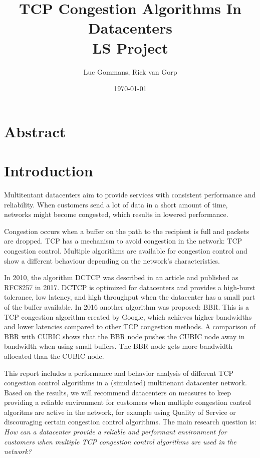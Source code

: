 \documentclass{article}
\title{TCP Congestion Algorithms In Datacenters \\
	\vspace{0.3cm}
	{\large LS Project}
}
\date{\today{}}
\author{Luc Gommans, Rick van Gorp}
\begin{document}
\maketitle

\section{Abstract}


\section{Introduction}


Multitentant datacenters aim to provide services with consistent performance
and reliability. When customers send a lot of data in a short amount of time,
networks might become congested, which results in lowered performance.

Congestion occurs when a buffer on the path to the recipient is full and
packets are dropped. TCP has a mechanism to avoid congestion in the network:
TCP congestion control. Multiple algorithms are available for congestion
control and show a different behaviour depending on the network's
characteristics.

In 2010, the algorithm DCTCP was described in an
article\cite{dctcp-congestion-original} and published as RFC8257 in
2017\cite{dctcp-congestion}. DCTCP is optimized for datacenters and provides a
high-burst tolerance, low latency, and high throughput when the datacenter has
a small part of the buffer available\cite{dctcp-congestion}. In 2016 another
algorithm was proposed: BBR. This is a TCP congestion algorithm created by
Google, which achieves higher bandwidths and lower latencies compared to other
TCP congestion methods\cite{bbr-congestion}. A comparison of BBR with
CUBIC\cite{bbr-congestion-comparison} shows that the BBR node pushes the CUBIC
node away in bandwidth when using small buffers. The BBR node gets more
bandwidth allocated than the CUBIC node.

This report includes a performance and behavior analysis of different TCP congestion control algorithms in a (simulated) multitenant datacenter network. Based on the results, we will recommend datacenters on measures to keep providing a reliable environment for customers when multiple congestion control algoritms are active in the network, for example using Quality of Service or discouraging certain congestion control algorithms. The main research question is: {\it How can a datacenter provide a reliable and performant environment for customers when multiple TCP congestion control algorithms are used in the
network?}
\end{document}
